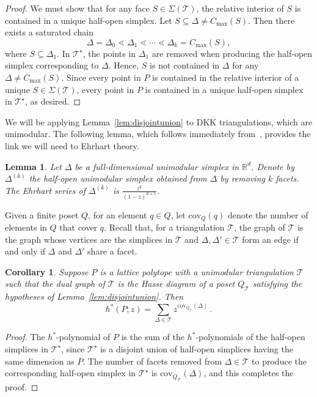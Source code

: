 \documentclass[12pt]{amsart}
\newtheorem{lemma}[theorem]{Lemma}
\newtheorem{corollary}[theorem]{Corollary}
\theoremstyle{definition}
\newcommand\R{\mathbb{R}}
\newcommand\calT{\mathcal{T}}
\newcommand{\cov}{\mathrm{cov}}
\begin{document}
\begin{proof}
    We must show that for any face $S\in\Sigma(\calT)$, the relative interior of $S$ is contained in a unique half-open simplex.
    Let $S\subseteq\Delta\neq C_{\max}(S)$.
    Then there exists a saturated chain 
    \[
        \Delta = \Delta_0 \lessdot \Delta_1 \lessdot \cdots \lessdot \Delta_k = C_{\max}(S),
    \]
    where $S\subseteq\Delta_1$.
    In $\calT^\star$, the points in $\Delta_1$ are removed when producing the half-open simplex corresponding to $\Delta$.
    Hence, $S$ is not contained in $\Delta$ for any $\Delta\neq C_{\max}(S)$.
    Since every point in $P$ is contained in the relative interior of a unique $S\in\Sigma(\calT)$, every point in $P$ is contained in a unique half-open simplex in $\calT^\star$, as desired. 
\end{proof}

We will be applying Lemma~\ref{lem:disjointunion} to DKK triangulations, which are unimodular.
The following lemma, which follows immediately from~\cite[Section 3.1]{kvbarvinok}, provides the link we will need to Ehrhart theory.

\begin{lemma}\label{lem:ehrharthalfopensimplex}
    Let $\Delta$ be a full-dimensional unimodular simplex in $\R^d$.
    Denote by $\Delta^{(k)}$ the half-open unimodular simplex obtained from $\Delta$ by removing $k$ facets.
    The Ehrhart series of $\Delta^{(k)}$ is $\frac{z^k}{(1-z)^{d+1}}$.
\end{lemma}

Given a finite poset $Q$, for an element $q\in Q$, let $\cov_Q(q)$ denote the number of elements in $Q$ that cover $q$.
Recall that, for a triangulation $\calT$, the graph of $\calT$ is the graph whose vertices are the simplices in $\calT$ and $\Delta,\Delta' \in \calT$ form an edge if and only if $\Delta$ and $\Delta'$ share a facet. 

\begin{corollary}\label{cor:hstarcovering}
    Suppose $P$ is a lattice polytope with a unimodular triangulation $\calT$ such that the dual graph of $\calT$ is the Hasse diagram of a poset $Q_\calT$ satisfying the hypotheses of Lemma~\ref{lem:disjointunion}.
    Then
    \[
    h^*(P;z)=\sum_{\Delta\in\calT}z^{\cov_{Q_\calT}(\Delta)} \, .
    \]
\end{corollary}

\begin{proof}
    The $h^*$-polynomial of $P$ is the sum of the $h^*$-polynomials of the half-open simplices in $\calT^\star$, since $\calT^\star$ is a disjoint union of half-open simplices having the same dimension as $P$.
    The number of facets removed from $\Delta\in\calT$ to produce the corresponding half-open simplex in $\calT^\star$ is $\cov_{Q_\calT}(\Delta)$, and this completes the proof.
\end{proof}
\end{document}
